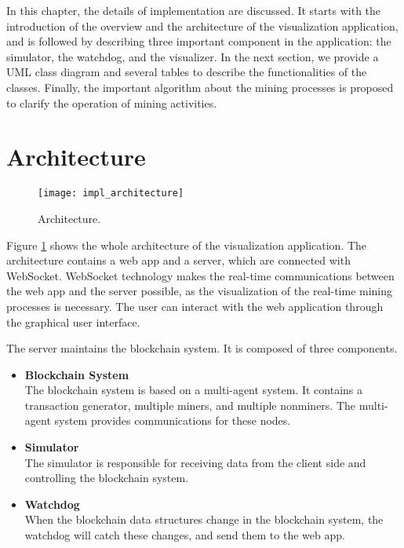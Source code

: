 In this chapter, the details of implementation are discussed. It starts with the introduction of the overview and the architecture of the visualization application, and is followed by describing three important component in the application: the simulator, the watchdog, and the visualizer. In the next section, we provide a UML class diagram and several tables to describe the functionalities of the classes. Finally, the important algorithm about the mining processes is proposed to clarify  the operation of mining activities.

\section{Architecture}

\begin{figure}[htb]
    \centering
    \texttt{[image: impl\_architecture]}
    \caption{Architecture.}
    \label{fig:architecture}
\end{figure}

Figure \ref{fig:architecture} shows the whole architecture of the visualization application. The architecture contains a web app and a server, which are connected with WebSocket. WebSocket technology makes the real-time communications between the web app and the server possible, as the visualization of the real-time mining processes is necessary. The user can interact with the web application through the graphical user interface.

The server maintains the blockchain system. It is composed of three components.

\begin{itemize}
    \item \textbf{Blockchain System} \\
        The blockchain system is based on a multi-agent system. It contains a transaction generator, multiple miners, and multiple nonminers. The multi-agent system provides communications for these nodes.
    \item \textbf{Simulator} \\
        The simulator is responsible for receiving data from the client side and controlling the blockchain system.
    \item \textbf{Watchdog} \\
        When the blockchain data structures change in the blockchain system, the watchdog will catch these changes, and send them to the web app. 
\end{itemize}

